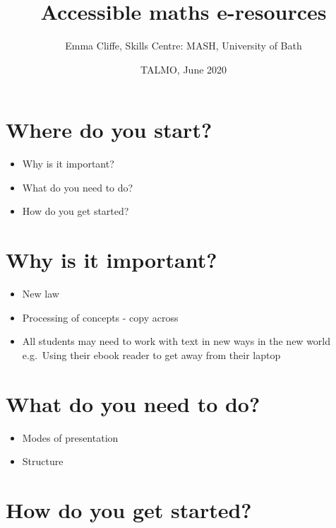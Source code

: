 \documentclass[
  12pt,
  english,
  a4paper]{extarticle}
\title{Accessible maths e-resources}
\author{Emma Cliffe, Skills Centre: MASH, University of Bath}
\date{TALMO, June 2020}
\providecommand{\tightlist}{%
  \setlength{\itemsep}{0pt}\setlength{\parskip}{0pt}}
\theoremstyle{plain}
\theoremstyle{plain}
\theoremstyle{plain}
\theoremstyle{plain}
\theoremstyle{plain}
\theoremstyle{definition}
\theoremstyle{definition}
\theoremstyle{definition}
\theoremstyle{remark}
\renewcommand{\;}{\,}
\begin{document}
\maketitle

{
\setcounter{tocdepth}{2}
\tableofcontents
}
\newpage
{}

\hypertarget{where-do-you-start}{%
\section*{Where do you start?}\label{where-do-you-start}}

\begin{itemize}
\tightlist
\item
  Why is it important?
\item
  What do you need to do?
\item
  How do you get started?
\end{itemize}

\hypertarget{why-is-it-important}{%
\section{Why is it important?}\label{why-is-it-important}}

\begin{itemize}
\tightlist
\item
  New law
\item
  Processing of concepts - copy across
\item
  All students may need to work with text in new ways in the new world e.g.~Using their ebook reader to get away from their laptop
\end{itemize}

\hypertarget{what-do-you-need-to-do}{%
\section{What do you need to do?}\label{what-do-you-need-to-do}}

\begin{itemize}
\tightlist
\item
  Modes of presentation
\item
  Structure
\end{itemize}

\hypertarget{how-do-you-get-started}{%
\section{How do you get started?}\label{how-do-you-get-started}}
\end{document}
